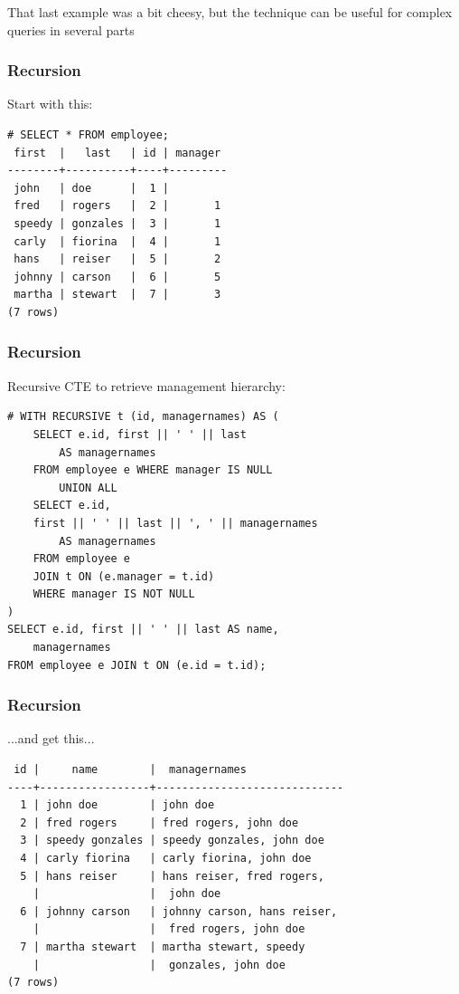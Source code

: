 \documentclass{beamer}
\begin{document}
\begin{frame}
    \begin{center}
    That last example was a bit cheesy, but the technique can be useful for complex queries in several parts
    \end{center}
\end{frame}

\begin{frame}[fragile]
    \frametitle{Recursion}
    Start with this:
    \begin{verbatim}
# SELECT * FROM employee;
 first  |   last   | id | manager
--------+----------+----+---------
 john   | doe      |  1 |
 fred   | rogers   |  2 |       1
 speedy | gonzales |  3 |       1
 carly  | fiorina  |  4 |       1
 hans   | reiser   |  5 |       2
 johnny | carson   |  6 |       5
 martha | stewart  |  7 |       3
(7 rows)
    \end{verbatim}
\end{frame}

\begin{frame}[fragile]
    \frametitle{Recursion}
    Recursive CTE to retrieve management hierarchy:
    \begin{verbatim}
# WITH RECURSIVE t (id, managernames) AS (
    SELECT e.id, first || ' ' || last
        AS managernames
    FROM employee e WHERE manager IS NULL
        UNION ALL
    SELECT e.id,
    first || ' ' || last || ', ' || managernames
        AS managernames
    FROM employee e
    JOIN t ON (e.manager = t.id)
    WHERE manager IS NOT NULL
)
SELECT e.id, first || ' ' || last AS name,
    managernames
FROM employee e JOIN t ON (e.id = t.id);
    \end{verbatim}
\end{frame}

\begin{frame}[fragile]
    \frametitle{Recursion}
    ...and get this...
    \begin{verbatim}
 id |     name        |  managernames                   
----+-----------------+-----------------------------
  1 | john doe        | john doe
  2 | fred rogers     | fred rogers, john doe
  3 | speedy gonzales | speedy gonzales, john doe
  4 | carly fiorina   | carly fiorina, john doe
  5 | hans reiser     | hans reiser, fred rogers,
    |                 |  john doe
  6 | johnny carson   | johnny carson, hans reiser,
    |                 |  fred rogers, john doe
  7 | martha stewart  | martha stewart, speedy
    |                 |  gonzales, john doe
(7 rows)
    \end{verbatim}
\end{frame}
\end{document}
